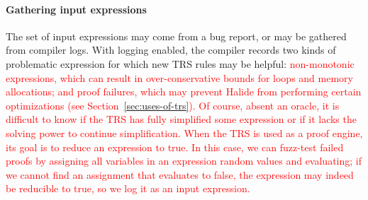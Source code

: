 \documentclass[acmsmall,review]{acmart}\settopmatter{printfolios=true,printccs=false,printacmref=false}
\newcommand{\modified}[1]{\textcolor{red}{{#1}}}
\begin{document}
\paragraph{Gathering input expressions}
The set of input expressions may come from a bug report, or may be gathered from compiler logs. With logging enabled, the compiler records two
kinds of problematic expression for which new TRS rules may be helpful:
\modified{non-monotonic expressions, which can result in over-conservative
bounds for loops and memory allocations; and proof failures,
which may prevent Halide from performing certain optimizations
(see Section~\ref{sec:uses-of-trs}). 
Of course, absent an oracle, it is difficult to know if the TRS has fully simplified 
some expression or if it lacks the solving power to continue simplification. 
When the TRS is used as a proof engine, its goal is to reduce an expression to true.
In this case, we can fuzz-test failed proofs by assigning all variables in an expression
random values and evaluating; if we cannot find an assignment that evaluates to false,
the expression may indeed be reducible to true, so we log it as an input expression.}
\end{document}
